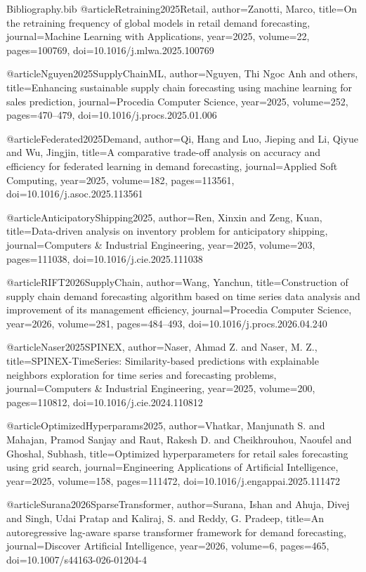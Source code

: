 \begin{filecontents*}{Bibliography.bib}
@article{Retraining2025Retail,
 author={Zanotti, Marco}, title={On the retraining frequency of global models in retail demand forecasting}, journal={Machine Learning with Applications}, year={2025}, volume={22}, pages={100769}, doi={10.1016/j.mlwa.2025.100769}}

@article{Nguyen2025SupplyChainML,
 author={Nguyen, Thi Ngoc Anh and others}, title={Enhancing sustainable supply chain forecasting using machine learning for sales prediction}, journal={Procedia Computer Science}, year={2025}, volume={252}, pages={470--479}, doi={10.1016/j.procs.2025.01.006}}

@article{Federated2025Demand,
 author={Qi, Hang and Luo, Jieping and Li, Qiyue and Wu, Jingjin}, title={A comparative trade-off analysis on accuracy and efficiency for federated learning in demand forecasting}, journal={Applied Soft Computing}, year={2025}, volume={182}, pages={113561}, doi={10.1016/j.asoc.2025.113561}}

@article{AnticipatoryShipping2025,
 author={Ren, Xinxin and Zeng, Kuan}, title={Data-driven analysis on inventory problem for anticipatory shipping}, journal={Computers \& Industrial Engineering}, year={2025}, volume={203}, pages={111038}, doi={10.1016/j.cie.2025.111038}}

@article{RIFT2026SupplyChain,
 author={Wang, Yanchun}, title={Construction of supply chain demand forecasting algorithm based on time series data analysis and improvement of its management efficiency}, journal={Procedia Computer Science}, year={2026}, volume={281}, pages={484--493}, doi={10.1016/j.procs.2026.04.240}}

@article{Naser2025SPINEX,
 author={Naser, Ahmad Z. and Naser, M. Z.},
 title={SPINEX-TimeSeries: Similarity-based predictions with explainable neighbors exploration for time series and forecasting problems},
 journal={Computers \& Industrial Engineering},
 year={2025},
 volume={200},
 pages={110812},
 doi={10.1016/j.cie.2024.110812}}

@article{OptimizedHyperparams2025,
 author={Vhatkar, Manjunath S. and Mahajan, Pramod Sanjay and Raut, Rakesh D. and Cheikhrouhou, Naoufel and Ghoshal, Subhash}, title={Optimized hyperparameters for retail sales forecasting using grid search}, journal={Engineering Applications of Artificial Intelligence}, year={2025}, volume={158}, pages={111472}, doi={10.1016/j.engappai.2025.111472}}

@article{Surana2026SparseTransformer,
 author={Surana, Ishan and Ahuja, Divej and Singh, Udai Pratap and Kaliraj, S. and Reddy, G. Pradeep},
 title={An autoregressive lag-aware sparse transformer framework for demand forecasting},
 journal={Discover Artificial Intelligence}, year={2026}, volume={6}, pages={465},
 doi={10.1007/s44163-026-01204-4}}
\end{filecontents*}

